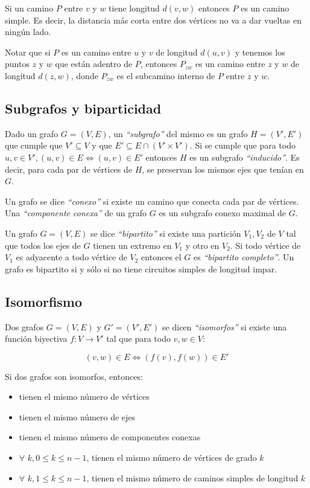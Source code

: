 Si un camino $P$ entre $v$ y $w$ tiene longitud $d(v, w)$ entonces $P$ es un camino simple. Es decir, la distancia m\'as corta entre dos v\'ertices no va a dar vueltas en ning\'un lado.

Notar que si $P$ es un camino entre $u$ y $v$ de longitud $d(u,v)$ y tenemos los puntos $z$ y $w$ que est\'an adentro de $P$, entonces $P_{zw}$ es un camino entre $z$ y $w$ de longitud $d(z,w)$, donde $P_{zw}$ es el subcamino interno de $P$ entre $z$ y $w$.

\subsection{Subgrafos y biparticidad}

Dado un grafo $G = (V,E)$, un \emph{``subgrafo''} del mismo es un grafo $H = (V',E')$ que cumple que $V' \subseteq V$ y que $E' \subseteq E \cap (V' \times V')$. Si se cumple que para todo $u,v \in V', (u,v) \in E \Longleftrightarrow (u,v) \in E'$ entonces $H$ es un subgrafo \emph{``inducido''}. Es decir, para cada par de v\'ertices de $H$, se preservan los mismos ejes que ten\'ian en $G$.


Un grafo se dice \emph{``conexo''} si existe un camino que conecta cada par de v\'ertices. Una \emph{``componente conexa''} de un grafo $G$ es un subgrafo conexo maximal de $G$.

Un grafo $G = (V, E)$ se dice \emph{``bipartito''} si existe una partici\'on $V_1,V_2$ de $V$ tal que todos los ejes de $G$ tienen un extremo en $V_1$ y otro en $V_2$. Si todo v\'ertice de $V_1$ es adyacente a todo v\'ertice de $V_2$ entonces el $G$ es \emph{``bipartito completo''}. Un grafo es bipartito si y s\'olo si no tiene circuitos simples de longitud impar.

\subsection{Isomorfismo}

Dos grafos $G = (V,E)$ y $G' = (V',E')$ se dicen \emph{``isomorfos''} si existe una funci\'on biyectiva $f:V\rightarrow V'$ tal que para todo $v,w \in V$:

\begin{figure}[h]
\[ (v,w) \in E \Longleftrightarrow (f(v), f(w)) \in E' \]
\end{figure}

Si dos grafos son isomorfos, entonces:

\begin{itemize}
\item tienen el mismo n\'umero de v\'ertices
\item tienen el mismo n\'umero de ejes
\item tienen el mismo n\'umero de componentes conexas
\item $\forall$ $k, 0 \leq k \leq n-1$, tienen el mismo n\'umero de v\'ertices de grado $k$
\item $\forall$ $k, 1 \leq k \leq n-1$, tienen el mismo n\'umero de caminos simples de longitud $k$
\end{itemize}

